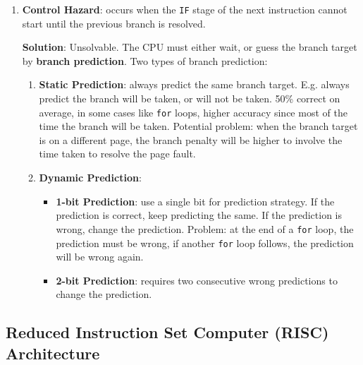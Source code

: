 \begin{enumerate}
    \item \textbf{Control Hazard}: occurs when the \texttt{IF} stage of the next instruction cannot start
        until the previous branch is resolved.

        \textbf{Solution}: Unsolvable. The CPU must either wait, or guess the branch target by \textbf{branch
        prediction}. Two types of branch prediction:
        \begin{enumerate}
            \item \textbf{Static Prediction}: always predict the same branch target. E.g. always predict
                the branch will be taken, or will not be taken. 50\% correct on average, in some cases like
                \texttt{for} loops, higher accuracy since most of the time the branch will be taken.
                Potential problem: when the branch target is on a different page, the branch penalty will be
                higher to involve the time taken to resolve the page fault.
            \item \textbf{Dynamic Prediction}:
                \begin{itemize}
                    \item \textbf{1-bit Prediction}: use a single bit for prediction strategy. If the prediction
                        is correct, keep predicting the same. If the prediction is wrong, change the prediction.
                        Problem: at the end of a \texttt{for} loop, the prediction must be wrong, if another
                        \texttt{for} loop follows, the prediction will be wrong again.
                    \item \textbf{2-bit Prediction}: requires two consecutive wrong predictions to change the
                        prediction.
                \end{itemize}
        \end{enumerate}
    
\end{enumerate}

\subsection{Reduced Instruction Set Computer (RISC) Architecture}

